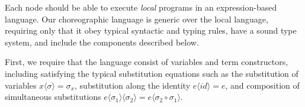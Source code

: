 Each node should be able to execute \emph{local} programs in an expression-based language.
Our choreographic language is generic over the local language, requiring only that it obey typical syntactic and typing rules, have a sound type system, and include the components described below.

First, we require that the language consist of variables and term constructors, including satisfying the typical substitution equations such as the substitution of variables $x \langle \sigma \rangle = \sigma_x$, substitution along the identity $e \langle  id \rangle = e$, and composition of simultaneous substitutions $e \langle \sigma_1 \rangle \langle \sigma_2 \rangle = e \langle \sigma_2 \circ \sigma_1 \rangle$.

